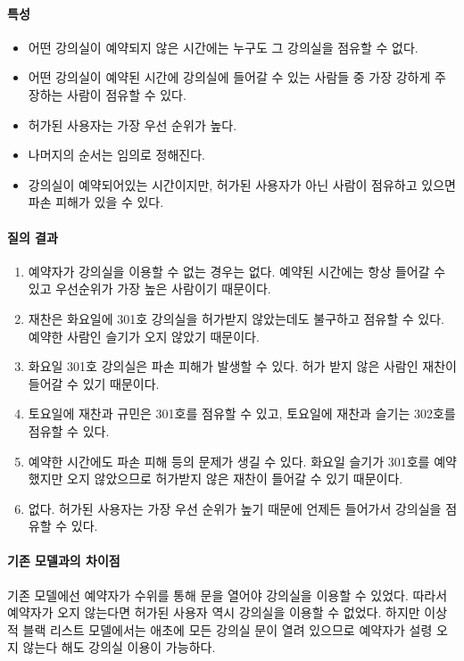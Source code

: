 \documentclass[11pt,a4paper]{article}
\begin{document}
\paragraph{특성}
\begin{itemize}
\item 어떤 강의실이 예약되지 않은 시간에는 누구도 그 강의실을 점유할 수 없다.
\item 어떤 강의실이 예약된 시간에 강의실에 들어갈 수 있는 사람들 중 가장 강하게
주장하는 사람이 점유할 수 있다.
\item 허가된 사용자는 가장 우선 순위가 높다.
\item 나머지의 순서는 임의로 정해진다.
\item 강의실이 예약되어있는 시간이지만, 허가된 사용자가 아닌 사람이 점유하고
있으면 파손 피해가 있을 수 있다.
\end{itemize}

\paragraph{질의 결과}
\begin{enumerate}
\item 예약자가 강의실을 이용할 수 없는 경우는 없다. 예약된 시간에는 항상 들어갈
수 있고 우선순위가 가장 높은 사람이기 때문이다.
\item 재찬은 화요일에 301호 강의실을 허가받지 않았는데도 불구하고 점유할 수
있다. 예약한 사람인 슬기가 오지 않았기 때문이다.
\item 화요일 301호 강의실은 파손 피해가 발생할 수 있다. 허가 받지 않은 사람인
재찬이 들어갈 수 있기 때문이다.
\item 토요일에 재찬과 규민은 301호를 점유할 수 있고, 토요일에 재찬과 슬기는
302호를 점유할 수 있다.
\item 예약한 시간에도 파손 피해 등의 문제가 생길 수 있다. 화요일 슬기가 301호를
예약했지만 오지 않았으므로 허가받지 않은 재찬이 들어갈 수 있기 때문이다.
\item 없다. 허가된 사용자는 가장 우선 순위가 높기 때문에 언제든 들어가서
강의실을 점유할 수 있다.
\end{enumerate}

\paragraph{기존 모델과의 차이점}
\hfill\break
\indent
기존 모델에선 예약자가 수위를 통해 문을 열어야 강의실을 이용할 수 있었다.
따라서 예약자가 오지 않는다면 허가된 사용자 역시 강의실을 이용할 수 없었다.
하지만 이상적 블랙 리스트 모델에서는 애초에 모든 강의실 문이 열려 있으므로
예약자가 설령 오지 않는다 해도 강의실 이용이 가능하다.
\end{document}
